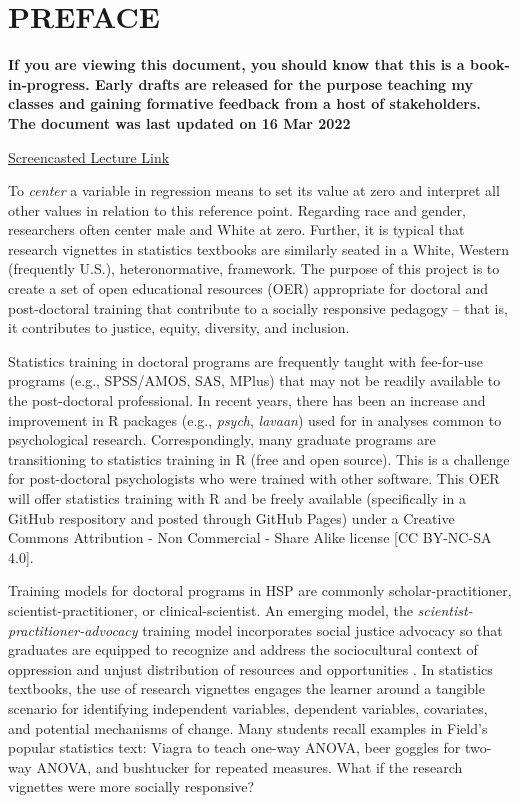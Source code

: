 \documentclass[
]{book}
\begin{document}
\hypertarget{preface}{%
\chapter*{PREFACE}\label{preface}}

\textbf{If you are viewing this document, you should know that this is a book-in-progress. Early drafts are released for the purpose teaching my classes and gaining formative feedback from a host of stakeholders. The document was last updated on 16 Mar 2022}

\href{https://spu.hosted.panopto.com/Panopto/Pages/Viewer.aspx?id=c932455e-ef06-444a-bdca-acf7012d759a}{Screencasted Lecture Link}

To \emph{center} a variable in regression means to set its value at zero and interpret all other values in relation to this reference point. Regarding race and gender, researchers often center male and White at zero. Further, it is typical that research vignettes in statistics textbooks are similarly seated in a White, Western (frequently U.S.), heteronormative, framework. The purpose of this project is to create a set of open educational resources (OER) appropriate for doctoral and post-doctoral training that contribute to a socially responsive pedagogy -- that is, it contributes to justice, equity, diversity, and inclusion.

Statistics training in doctoral programs are frequently taught with fee-for-use programs (e.g., SPSS/AMOS, SAS, MPlus) that may not be readily available to the post-doctoral professional. In recent years, there has been an increase and improvement in R packages (e.g., \emph{psych}, \emph{lavaan}) used for in analyses common to psychological research. Correspondingly, many graduate programs are transitioning to statistics training in R (free and open source). This is a challenge for post-doctoral psychologists who were trained with other software. This OER will offer statistics training with R and be freely available (specifically in a GitHub respository and posted through GitHub Pages) under a Creative Commons Attribution - Non Commercial - Share Alike license {[}CC BY-NC-SA 4.0{]}.

Training models for doctoral programs in HSP are commonly scholar-practitioner, scientist-practitioner, or clinical-scientist. An emerging model, the \emph{scientist-practitioner-advocacy} training model incorporates social justice advocacy so that graduates are equipped to recognize and address the sociocultural context of oppression and unjust distribution of resources and opportunities \citep{mallinckrodt_scientist-practitioner-advocate_2014}. In statistics textbooks, the use of research vignettes engages the learner around a tangible scenario for identifying independent variables, dependent variables, covariates, and potential mechanisms of change. Many students recall examples in Field's \citeyearpar{field_discovering_2012} popular statistics text: Viagra to teach one-way ANOVA, beer goggles for two-way ANOVA, and bushtucker for repeated measures. What if the research vignettes were more socially responsive?
\end{document}
